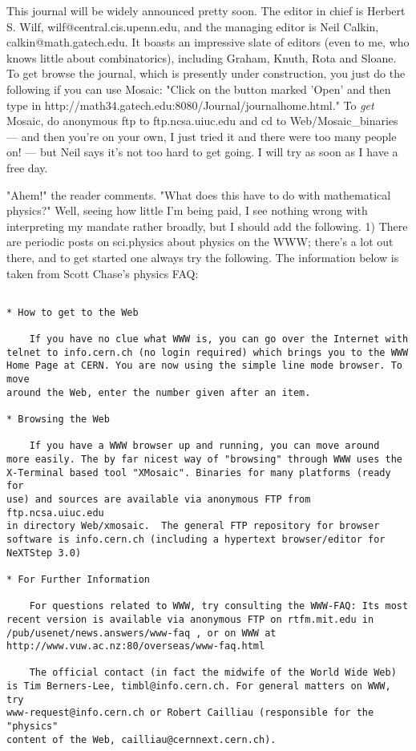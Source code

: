 This journal will be widely announced pretty soon.  The editor in chief
is Herbert S.  Wilf, wilf@central.cis.upenn.edu, and the managing editor
is Neil Calkin, calkin@math.gatech.edu.  It boasts an impressive slate
of editors (even to me, who knows little about combinatorics), including
Graham, Knuth, Rota and Sloane.  To get browse the journal, which is
presently under construction, you just do the following if you can use
Mosaic: "Click on the button marked 'Open' and then type in
http://math34.gatech.edu:8080/Journal/journalhome.html."  To \emph{get}
Mosaic, do anonymous ftp to ftp.ncsa.uiuc.edu and cd to
Web/Mosaic_binaries --- and then you're on your own, I just tried it and
there were too many people on! --- but Neil says it's not too hard to
get going.  I will try as soon as I have a free day.

"Ahem!" the reader comments.  "What does this have to do with
mathematical physics?"  Well, seeing how little I'm being paid, I see
nothing wrong with interpreting my mandate rather broadly, but I should
add the following. 1) There are periodic posts on sci.physics about physics
on the WWW; there's a lot out there, and to get started one always try
the following.  The information below is taken from Scott Chase's
physics FAQ:

\begin{verbatim}

* How to get to the Web

   	If you have no clue what WWW is, you can go over the Internet with
telnet to info.cern.ch (no login required) which brings you to the WWW 
Home Page at CERN. You are now using the simple line mode browser. To move 
around the Web, enter the number given after an item. 

* Browsing the Web

	If you have a WWW browser up and running, you can move around
more easily. The by far nicest way of "browsing" through WWW uses the
X-Terminal based tool "XMosaic". Binaries for many platforms (ready for
use) and sources are available via anonymous FTP from ftp.ncsa.uiuc.edu
in directory Web/xmosaic.  The general FTP repository for browser
software is info.cern.ch (including a hypertext browser/editor for
NeXTStep 3.0)

* For Further Information

	For questions related to WWW, try consulting the WWW-FAQ: Its most 
recent version is available via anonymous FTP on rtfm.mit.edu in 
/pub/usenet/news.answers/www-faq , or on WWW at 
http://www.vuw.ac.nz:80/overseas/www-faq.html

	The official contact (in fact the midwife of the World Wide Web) 
is Tim Berners-Lee, timbl@info.cern.ch. For general matters on WWW, try 
www-request@info.cern.ch or Robert Cailliau (responsible for the "physics" 
content of the Web, cailliau@cernnext.cern.ch).
\end{verbatim}
    


